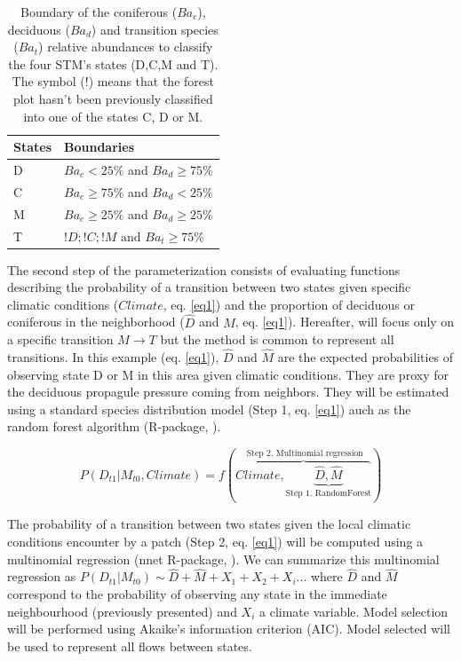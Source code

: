 \begin{table}[h]
\vspace{-1em}
\centering
\caption{Boundary of the coniferous ($Ba_c$), deciduous ($Ba_d$) and transition species ($Ba_t$) relative abundances to classify the four STM's states (D,C,M and T). The symbol ($!$) means that the forest plot hasn't been previously classified into one of the states C, D or M.}
\vspace{-1em}
\begin{tabular}{|l|l|}
	\hline
	States  & Boundaries                            \\
	\hline
	D & $Ba_c< 25\%$ and $Ba_d \geq 75\%$    \\
	C & $Ba_c \geq 75\%$ and $Ba_d < 25\%$    \\
	M & $Ba_c \geq 25\%$ and $Ba_d \geq 25\%$ \\
	T & $!D;!C;!M \text{ and }  Ba_t  \geq 75\%$ \\
	\hline                               
\end{tabular}

\label{bound}
\end{table}

The second step of the parameterization consists of evaluating functions
describing the probability of a transition between two states given specific
climatic conditions ($Climate$, eq. \ref{eq1}) and the proportion of deciduous
or coniferous in the neighborhood ($\hat{D}$ and $\hat{M}$, eq. \ref{eq1}).
Hereafter, will focus only on a specific transition $M \rightarrow T$ but the
method is common to represent  all transitions. In this example (eq.
\ref{eq1}),  $\hat{D}$ and $\hat{M}$ are the expected probabilities of
observing state D or M in this area given climatic conditions. They are proxy
for the deciduous propagule pressure coming from neighbors. They will be
estimated using  a standard species distribution model (Step 1, eq. \ref{eq1})
auch as the random forest algorithm (R-package, \cite{Liaw2002a}).

\begin{equation}
	P(D_{t1}|M_{t0}, Climate) = f(\overbrace{Climate, \underbrace{\hat{D}, \hat{M}}_\text{Step 1. RandomForest}}^\text{ Step 2. Multinomial regression})
\label{eq1}
\end{equation}

The probability of a transition between two states given the local climatic
conditions encounter by a patch (Step 2, eq. \ref{eq1}) will be computed using a multinomial
regression (nnet R-package, \cite{Venables2002}). We can summarize this
multinomial regression as $P(D_{t1}|M_{t0}) \sim \hat{D} + \hat{M} +
X_1+X_2+X_i... $ where $\hat{D}$ and $\hat{M}$ correspond to the probability
of observing any state in the immediate neighbourhood (previously presented)
and $X_i$ a climate variable. Model selection will be performed using Akaike's
information criterion (AIC). Model selected will be used to represent all
flows between states.   \\

